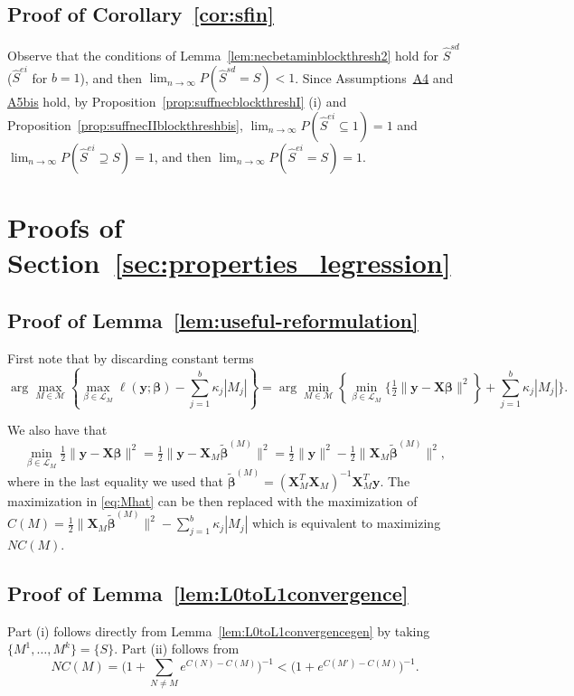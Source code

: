 \documentclass[
  12pt]{article}
\newcommand{\M}{\mathcal{M}}
\newcommand{\by}{\mathbf{y}}
\newcommand{\bbeta}{\boldsymbol{\beta}}
\newcommand{\bX}{\mathbf{X}}
\begin{document}
\subsection{Proof of Corollary~\ref{cor:sfin}} Observe that the conditions of Lemma~\ref{lem:necbetaminblockthresh2} hold for $\hat{S}^{sd}$ ($\hat{S}^{ei}$ for $b=1$), and then $\lim_{n\to \infty}P(\hat{S}^{sd} = S)<1$. Since Assumptions~\hyperlink{lab:A4}{A4} and \hyperlink{lab:A5bis}{A5bis} hold, by Proposition~\ref{prop:suffnecblockthreshI} (i) and Proposition~\ref{prop:suffnecIIblockthreshbis}, $\lim_{n\to \infty}P(\hat{S}^{ei} \subseteq 1)= 1$ and $\lim_{n\to \infty}P( \hat{S}^{ei} \supseteq S)=1$, and then $\lim_{n\to \infty}P(\hat{S}^{ei} = S)=1$.



\section{Proofs of Section~\ref{sec:properties_legression}}\label{suppsec:proofseclinreg}
\subsection{Proof of Lemma~\ref{lem:useful-reformulation}}
	First note that by discarding constant terms 
 $$\arg\max_{M\in \M} \left\{\max_{\beta\in \mathcal{L}_M}\ell(\by; \bbeta)-\sum_{j=1}^b\kappa_j |M_j| \right\}=\arg\min_{M\in \M} \left\{\min_{\beta\in \mathcal{L}_M}\bigg\{ \tfrac{1}{2}\|\by-\bX\bbeta\|^2\right\}+\sum_{j=1}^b\kappa_j |M_j| \bigg\}.$$
 
 We also have that 
 $$\min_{\beta\in \mathcal{L}_M} \tfrac{1}{2}\|\by-\bX\bbeta\|^2=\tfrac{1}{2}\|\by-\bX_{\!\!M}\tilde{\bbeta}^{(M)}\|^2=\tfrac{1}{2}\|\by\|^2-\tfrac{1}{2}\|\bX_{\!\!M}\tilde{\bbeta}^{(M)}\|^2,$$
where in the last equality we used that $\tilde{\bbeta}^{(M)}= (\bX_M^T \bX_M)^{-1} \bX_M^T \by$.
 The maximization in \eqref{eq:Mhat} can be then replaced with the maximization of $C(M)=\tfrac{1}{2}
 \|\bX_{\!\!M}\tilde{\bbeta}^{(M)}\|^2-\sum_{j=1}^b \kappa_j|M_j|$ which is equivalent to maximizing $NC(M)$.

\subsection{Proof of Lemma~\ref{lem:L0toL1convergence}}
Part (i) follows directly from Lemma~\ref{lem:L0toL1convergencegen} by taking $\{M^1,\ldots,M^k\}=\{S\}$.
Part (ii) follows from
$$NC(M)=\Big(1+\sum_{N \neq M} e^{C(N)-C(M)}\Big)^{-1}
< \big(1+ e^{C(M')-C(M)}\big)^{-1}.$$ 
\end{document}
